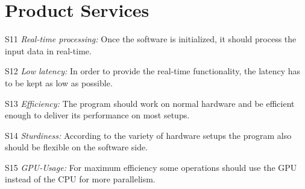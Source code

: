 \section{Product Services}

\begin{aims}
	\item[S11] \textit{Real-time processing:} Once the software is initialized, it should process the input data in real-time.
	
	\item[S12] \textit{Low latency:} In order to provide the real-time functionality, the latency has to be kept as low as possible.
	
	\item[S13] \textit{Efficiency:} The program should work on normal hardware and be efficient enough to deliver its performance on most setups. 
	
	\item[S14] \textit{Sturdiness:} According to the variety of hardware setups the program also should be flexible on the software side.
	
	\item[S15] \textit{GPU-Usage:} For maximum efficiency some operations should use the GPU instead of the CPU for more parallelism. 
\end{aims}